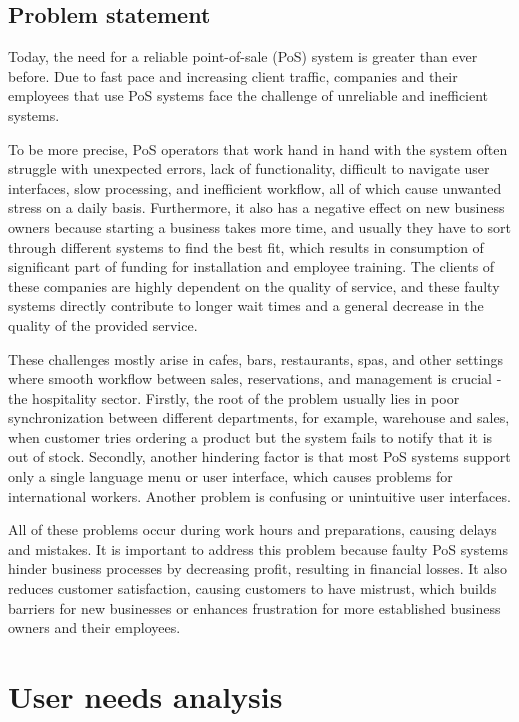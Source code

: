 \documentclass{article}
\begin{document}
\subsection{Problem statement}  Today, the need for a reliable point-of-sale (PoS) system is greater than ever before. Due to fast pace and increasing client traffic, companies and their employees that use PoS systems face the challenge of unreliable and inefficient systems.
\par To be more precise, PoS operators that work hand in hand with the system often struggle with unexpected errors, lack of functionality, difficult to navigate user interfaces, slow processing, and inefficient workflow, all of which cause unwanted stress on a daily basis. Furthermore, it also has a negative effect on new business owners because starting a business takes more time, and usually they have to sort through different systems to find the best fit, which results in consumption of significant part of funding for installation and employee training. The clients of these companies are highly dependent on the quality of service, and these faulty systems directly contribute to longer wait times and a general decrease in the quality of the provided service.
\par These challenges mostly arise in cafes, bars, restaurants, spas, and other settings where smooth workflow between sales, reservations, and management is crucial - the hospitality sector. Firstly, the root of the problem usually lies in poor synchronization between different departments, for example, warehouse and sales, when customer tries ordering a product but the system fails to notify that it is out of stock. Secondly, another hindering factor is that most PoS systems support only a single language menu or user interface, which causes problems for international workers. Another problem is confusing or unintuitive user interfaces.
\par All of these problems occur during work hours and preparations, causing delays and mistakes. It is important to address this problem because faulty PoS systems hinder business processes by decreasing profit, resulting in financial losses. It also reduces customer satisfaction, causing customers to have mistrust, which builds barriers for new businesses or enhances frustration for more established business owners and their employees.
\newpage

\section{User needs analysis}
\end{document}
